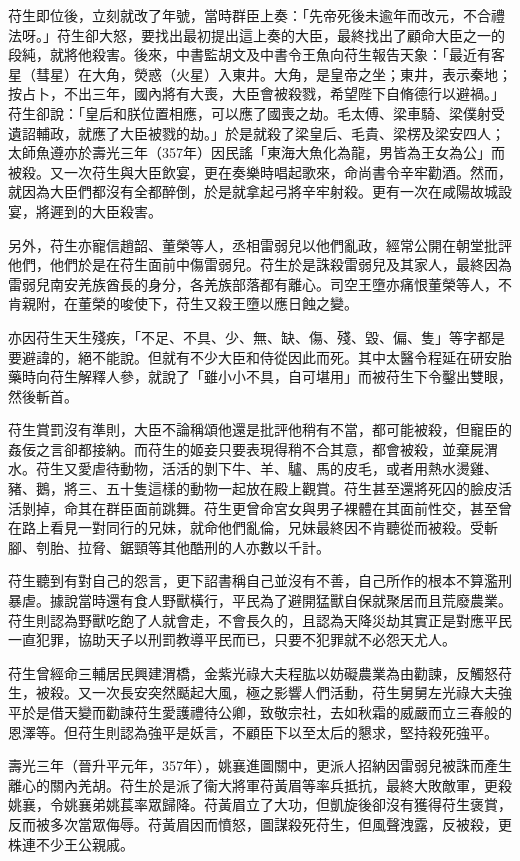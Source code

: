 苻生即位後，立刻就改了年號，當時群臣上奏：「先帝死後未逾年而改元，不合禮法呀。」苻生卻大怒，要找出最初提出這上奏的大臣，最終找出了顧命大臣之一的段純，就將他殺害。後來，中書監胡文及中書令王魚向苻生報告天象：「最近有客星（彗星）在大角，熒惑（火星）入東井。大角，是皇帝之坐；東井，表示秦地；按占卜，不出三年，國內將有大喪，大臣會被殺戮，希望陛下自脩德行以避禍。」苻生卻說：「皇后和朕位置相應，可以應了國喪之劫。毛太傅、梁車騎、梁僕射受遺詔輔政，就應了大臣被戮的劫。」於是就殺了梁皇后、毛貴、梁楞及梁安四人；太師魚遵亦於壽光三年（357年）因民謠「東海大魚化為龍，男皆為王女為公」而被殺。又一次苻生與大臣飲宴，更在奏樂時唱起歌來，命尚書令辛牢勸酒。然而，就因為大臣們都沒有全都醉倒，於是就拿起弓將辛牢射殺。更有一次在咸陽故城設宴，將遲到的大臣殺害。

另外，苻生亦寵信趙韶、董榮等人，丞相雷弱兒以他們亂政，經常公開在朝堂批評他們，他們於是在苻生面前中傷雷弱兒。苻生於是誅殺雷弱兒及其家人，最終因為雷弱兒南安羌族酋長的身分，各羌族部落都有離心。司空王墮亦痛恨董榮等人，不肯親附，在董榮的唆使下，苻生又殺王墮以應日蝕之變。

亦因苻生天生殘疾，「不足、不具、少、無、缺、傷、殘、毀、偏、隻」等字都是要避諱的，絕不能說。但就有不少大臣和侍從因此而死。其中太醫令程延在研安胎藥時向苻生解釋人參，就說了「雖小小不具，自可堪用」而被苻生下令鑿出雙眼，然後斬首。

苻生賞罰沒有準則，大臣不論稱頌他還是批評他稍有不當，都可能被殺，但寵臣的姦佞之言卻都接納。而苻生的姬妾只要表現得稍不合其意，都會被殺，並棄屍渭水。苻生又愛虐待動物，活活的剝下牛、羊、驢、馬的皮毛，或者用熱水燙雞、豬、鵝，將三、五十隻這樣的動物一起放在殿上觀賞。苻生甚至還將死囚的臉皮活活剝掉，命其在群臣面前跳舞。苻生更曾命宮女與男子裸體在其面前性交，甚至曾在路上看見一對同行的兄妹，就命他們亂倫，兄妹最終因不肯聽從而被殺。受斬腳、刳胎、拉脅、鋸頸等其他酷刑的人亦數以千計。

苻生聽到有對自己的怨言，更下詔書稱自己並沒有不善，自己所作的根本不算濫刑暴虐。據說當時還有食人野獸橫行，平民為了避開猛獸自保就聚居而且荒廢農業。苻生則認為野獸吃飽了人就會走，不會長久的，且認為天降災劫其實正是對應平民一直犯罪，協助天子以刑罰教導平民而已，只要不犯罪就不必怨天尤人。

苻生曾經命三輔居民興建渭橋，金紫光祿大夫程肱以妨礙農業為由勸諫，反觸怒苻生，被殺。又一次長安突然颳起大風，極之影響人們活動，苻生舅舅左光祿大夫強平於是借天變而勸諫苻生愛護禮待公卿，致敬宗社，去如秋霜的威嚴而立三春般的恩澤等。但苻生則認為強平是妖言，不顧臣下以至太后的懇求，堅持殺死強平。

壽光三年（晉升平元年，357年），姚襄進圖關中，更派人招納因雷弱兒被誅而產生離心的關內羌胡。苻生於是派了衞大將軍苻黃眉等率兵抵抗，最終大敗敵軍，更殺姚襄，令姚襄弟姚萇率眾歸降。苻黃眉立了大功，但凱旋後卻沒有獲得苻生褒賞，反而被多次當眾侮辱。苻黃眉因而憤怒，圖謀殺死苻生，但風聲洩露，反被殺，更株連不少王公親戚。

